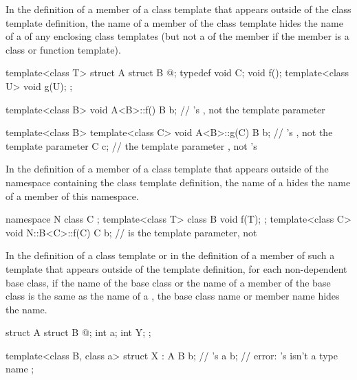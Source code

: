 \pnum
In the definition of a member of
a class template that appears outside of the class template definition,
the name of a member of the class template hides the name of a
of any enclosing class templates (but not a  of the
member if the member is a class or function template).
\begin{example}

\begin{codeblock}
template<class T> struct A {
  struct B { @\commentellip@ };
  typedef void C;
  void f();
  template<class U> void g(U);
};

template<class B> void A<B>::f() {
  B b;              // 's , not the template parameter
}

template<class B> template<class C> void A<B>::g(C) {
  B b;              // 's , not the template parameter
  C c;              // the template parameter , not 's 
}
\end{codeblock}
\end{example}

\pnum
In the definition of a member of a class template that appears outside of the
namespace containing the class template definition,
the name of a
hides the name of a member of this namespace.
\begin{example}

\begin{codeblock}
namespace N {
  class C { };
  template<class T> class B {
    void f(T);
  };
}
template<class C> void N::B<C>::f(C) {
  C b;              //  is the template parameter, not 
}
\end{codeblock}
\end{example}

\pnum
In the definition of a class template or in the definition of a member of such
a template that appears outside of the template definition,
for each non-dependent base class,
if the name of the base class
or the name of a member of the
base class is the same as the name of a
,
the base class name or member name hides the
name.
\begin{example}

\begin{codeblock}
struct A {
  struct B { @\commentellip@ };
  int a;
  int Y;
};

template<class B, class a> struct X : A {
  B b;              // 's 
  a b;              // error: 's  isn't a type name
};
\end{codeblock}
\end{example}

